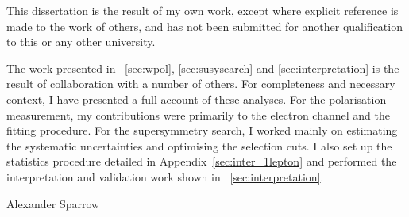 \begin{declaration}
  This dissertation is the result of my own work, except where explicit
  reference is made to the work of others, and has not been submitted
  for another qualification to this or any other university.

  The work presented in \chaps~\ref{sec:wpol}, \ref{sec:susysearch} and
  \ref{sec:interpretation} is the result of collaboration with a number of
  others. For completeness and necessary context, I have presented a full
  account of these analyses. For the \PW polarisation measurement, my
  contributions were primarily to the electron channel and the fitting
  procedure. For the supersymmetry search, I worked mainly on estimating the
  systematic uncertainties and optimising the selection cuts. I also set
  up the statistics procedure detailed in Appendix~\ref{sec:inter_1lepton} and
  performed the interpretation and validation work shown in
  \chap~\ref{sec:interpretation}.

  \vspace*{1cm}
  \begin{flushright}
    Alexander Sparrow
  \end{flushright}
\end{declaration}


